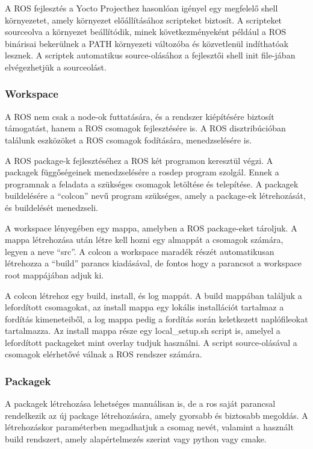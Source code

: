 \medskip

A ROS fejlesztés a Yocto Projecthez hasonlóan igényel egy megfelelő shell
környezetet, amely környezet előállításához scripteket biztosít. A scripteket
sourceolva a környezet beállítódik, minek következményeként például a ROS
binárisai bekerülnek a PATH környezeti változóba és közvetlenül indíthatóak
lesznek. A scriptek automatikus source-olásához a fejlesztői shell init
file-jában elvégezhetjük a sourceolást.

\subsubsection{Workspace}

A ROS nem csak a node-ok futtatására, és a rendszer kiépítésére biztosít
támogatást, hanem a ROS csomagok fejlesztésére is. A ROS disztribúcióban találunk
eszközöket a ROS csomagok fodítására, menedzselésére is.

A ROS package-k fejlesztéséhez a ROS két programon keresztül végzi. A packagek
függőségeinek menedzselésére a rosdep program szolgál. Ennek a programnak a
feladata a szükséges csomagok letöltése és telepítése. A packagek buildelésére a
``colcon'' nevű program szükséges, amely a package-ek létrehozását, és
buildelését menedzseli.

A workspace lényegében egy mappa, amelyben a ROS package-eket tároljuk.  A mappa
létrehozása után létre kell hozni egy almappát a csomagok számára, legyen a neve
``src''.  A colcon a workspace maradék részét automatikusan létrehozza a
``build'' parancs kiadásával, de fontos hogy a parancsot a workspace root
mappájában adjuk ki.

A colcon létrehoz egy build, install, és log mappát. A build
mappában találjuk a lefordított csomagokat, az install mappa egy lokális
installációt tartalmaz a fordítás kimeneteiből, a log mappa pedig a fordítás
során keletkezett naplófileokat tartalmazza. Az install mappa része egy
local\_setup.sh script is, amelyel a lefordított packageket mint overlay tudjuk
használni. A script source-olásával a csomagok elérhetővé válnak a ROS rendszer
számára.

\subsubsection{Packagek}

A packagek létrehozása lehetséges manuálisan is, de a ros saját parancsal
rendelkezik az új package létrehozására, amely gyorsabb és biztosabb megoldás. A
létrehozáskor paraméterben megadhatjuk a csomag nevét, valamint a használt build
rendszert, amely alapértelmezés szerint vagy python vagy cmake.

